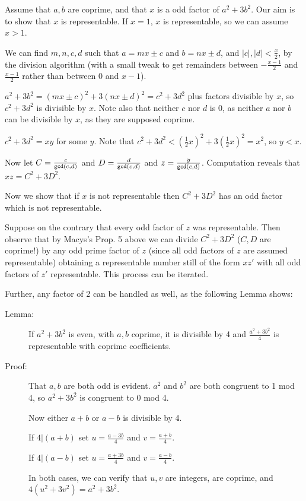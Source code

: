 \documentclass[12pt]{article}
\begin{document}
Assume that $a,b$ are coprime, and that $x$ is a odd factor of $a^2+3b^2$.  Our aim is to show that $x$ is representable.
If $x=1$, $x$ is representable, so we can assume $x>1$.

We can find $m,n,c,d$ such that $a=mx\pm c$ and $b=nx \pm d$, and $|c|, |d|<\frac x2$, by the division algorithm (with a small tweak to get remainders between $-\frac{x-1}2$ and $\frac{x-1}2$ rather than between $0$ and $x-1$).

$a^2+3b^2 = (mx\pm c)^2 +3(nx \pm d)^2 = c^2+3d^2$ plus factors divisible by $x$, so $c^2+3d^2$ is divisible by $x$.
Note also that neither $c$ nor $d$ is 0, as neither $a$  nor $b$ can be divisible by $x$, as they are supposed coprime.

$c^2+3d^2=xy$ for some $y$.  Note that $c^2+3d^2<(\frac 12 x)^2 + 3(\frac 12x)^2=x^2$, so $y<x$.

Now let $C = \frac c{{\tt gcd}(c,d)}$ and $D = \frac d{{\tt gcd}(c,d)}$ and $z=\frac y{{\tt gcd}(c,d)}$.  Computation reveals
that $xz=C^2+3D^2$.

Now we show that if $x$ is not representable then $C^2+3D^2$ has an odd factor which is not representable. 

Suppose on the contrary that every odd factor of $z$ was representable.  Then observe that by Macys's Prop. 5 above
we can divide $C^2+3D^2$ ($C,D$ are coprime!) by any odd prime factor of $z$ (since all odd factors of $z$ are assumed representable)
obtaining a representable number still of the form $xz'$ with all odd factors of $z'$ representable.   This process can be iterated.

Further, any factor of 2 can be handled as well, as the following Lemma shows:

\begin{description}

\item[Lemma:]  If $a^2+3b^2$ is even, with $a,b$ coprime, it is divisible by 4 and $\frac{a^2+3b^2}4$ is representable with coprime coefficients.

\item[Proof:]  That $a,b$ are both odd is evident.  $a^2$ and $b^2$ are both congruent to 1 mod 4,
so $a^2+3b^2$ is congruent to 0 mod 4.

Now either $a+b$ or $a-b$ is divisible by 4.

If $4|(a+b)$ set $u=\frac{a-3b}4$ and $v=\frac{a+b}4$.

If $4|(a-b)$ set $u=\frac{a+3b}4$ and $v=\frac{a-b}4$.

In both cases, we can verify that $u,v$ are integers, are coprime, and $4(u^2+3v^2)=a^2+3b^2$.


\end{description}
\end{document}
